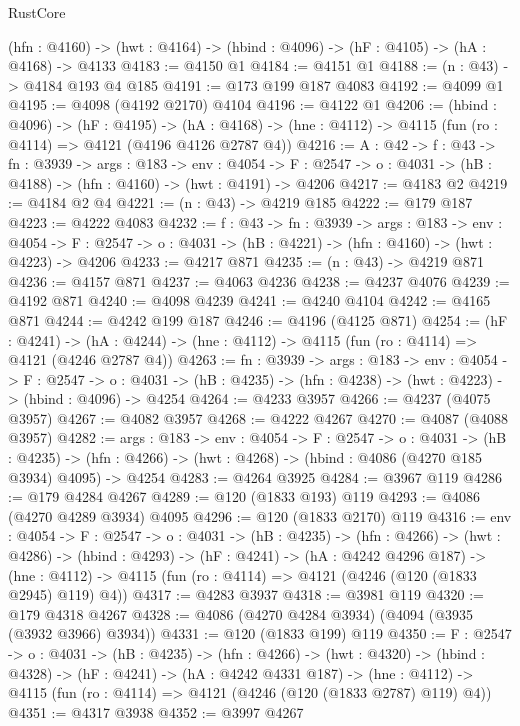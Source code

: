 \begin{lexlean}{RustCore}
\begin{coremodule}
  (hfn : @4160) -> (hwt : @4164) -> (hbind : @4096) -> (hF : @4105) -> (hA : @4168) -> @4133
@4183 := @4150 @1
@4184 := @4151 @1
@4188 := (n : @43) -> @4184 @193 @4 @185
@4191 := @173 @199 @187 @4083
@4192 := @4099 @1
@4195 := @4098 (@4192 @2170) @4104
@4196 := @4122 @1
@4206 := (hbind : @4096) ->
  (hF : @4195) ->
  (hA : @4168) -> (hne : @4112) -> @4115 (fun (ro : @4114) => @4121 (@4196 @4126 @2787 @4))
@4216 := {A : @42} ->
  {f : @43} ->
  {fn : @3939} ->
  {args : @183} ->
  {env : @4054} ->
  {F : @2547} -> {o : @4031} -> (hB : @4188) -> (hfn : @4160) -> (hwt : @4191) -> @4206
@4217 := @4183 @2
@4219 := @4184 @2 @4
@4221 := (n : @43) -> @4219 @185
@4222 := @179 @187
@4223 := @4222 @4083
@4232 := {f : @43} ->
  {fn : @3939} ->
  {args : @183} ->
  {env : @4054} ->
  {F : @2547} -> {o : @4031} -> (hB : @4221) -> (hfn : @4160) -> (hwt : @4223) -> @4206
@4233 := @4217 @871
@4235 := (n : @43) -> @4219 @871
@4236 := @4157 @871
@4237 := @4063 @4236
@4238 := @4237 @4076
@4239 := @4192 @871
@4240 := @4098 @4239
@4241 := @4240 @4104
@4242 := @4165 @871
@4244 := @4242 @199 @187
@4246 := @4196 (@4125 @871)
@4254 := (hF : @4241) ->
  (hA : @4244) -> (hne : @4112) -> @4115 (fun (ro : @4114) => @4121 (@4246 @2787 @4))
@4263 := {fn : @3939} ->
  {args : @183} ->
  {env : @4054} ->
  {F : @2547} ->
  {o : @4031} -> (hB : @4235) -> (hfn : @4238) -> (hwt : @4223) -> (hbind : @4096) -> @4254
@4264 := @4233 @3957
@4266 := @4237 (@4075 @3957)
@4267 := @4082 @3957
@4268 := @4222 @4267
@4270 := @4087 (@4088 @3957)
@4282 := {args : @183} ->
  {env : @4054} ->
  {F : @2547} ->
  {o : @4031} ->
  (hB : @4235) ->
  (hfn : @4266) -> (hwt : @4268) -> (hbind : @4086 (@4270 @185 @3934) @4095) -> @4254
@4283 := @4264 @3925
@4284 := @3967 @119
@4286 := @179 @4284 @4267
@4289 := @120 (@1833 @193) @119
@4293 := @4086 (@4270 @4289 @3934) @4095
@4296 := @120 (@1833 @2170) @119
@4316 := {env : @4054} ->
  {F : @2547} ->
  {o : @4031} ->
  (hB : @4235) ->
  (hfn : @4266) ->
  (hwt : @4286) ->
  (hbind : @4293) ->
  (hF : @4241) ->
  (hA : @4242 @4296 @187) ->
  (hne : @4112) -> @4115 (fun (ro : @4114) => @4121 (@4246 (@120 (@1833 @2945) @119) @4))
@4317 := @4283 @3937
@4318 := @3981 @119
@4320 := @179 @4318 @4267
@4328 := @4086 (@4270 @4284 @3934) (@4094 (@3935 (@3932 @3966) @3934))
@4331 := @120 (@1833 @199) @119
@4350 := {F : @2547} ->
  {o : @4031} ->
  (hB : @4235) ->
  (hfn : @4266) ->
  (hwt : @4320) ->
  (hbind : @4328) ->
  (hF : @4241) ->
  (hA : @4242 @4331 @187) ->
  (hne : @4112) -> @4115 (fun (ro : @4114) => @4121 (@4246 (@120 (@1833 @2787) @119) @4))
@4351 := @4317 @3938
@4352 := @3997 @4267

\end{coremodule}
\end{lexlean}
